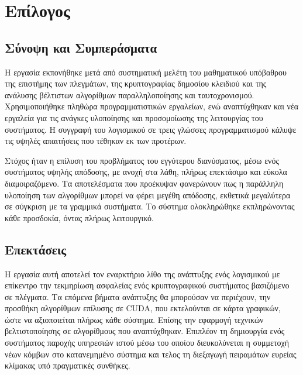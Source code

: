 \section{Επίλογος}
\label{chapClose}
\subsection{Σύνοψη και Συμπεράσματα}

Η εργασία εκπονήθηκε μετά από συστηματική μελέτη του μαθηματικού υπόβαθρου της επιστήμης των πλεγμάτων, της κρυπτογραφίας δημοσίου κλειδιού και της ανάλυσης βέλτιστων αλγορίθμων παραλληλοποίησης και ταυτοχρονισμού. Χρησιμοποιήθηκε πληθώρα προγραμματιστικών εργαλείων, ενώ αναπτύχθηκαν και νέα εργαλεία για τις ανάγκες υλοποίησης και προσομοίωσης της λειτουργίας του συστήματος. Η συγγραφή του λογισμικού σε τρεις γλώσσες προγραμματισμού κάλυψε τις υψηλές απαιτήσεις που τέθηκαν εκ των προτέρων. 

Στόχος ήταν η επίλυση του προβλήματος του εγγύτερου διανύσματος, μέσω ενός συστήματος υψηλής απόδοσης, με ανοχή στα λάθη, πλήρως επεκτάσιμο και εύκολα διαμοιραζόμενο. Τα αποτελέσματα που προέκυψαν φανερώνουν πως η παράλληλη υλοποίηση των αλγορίθμων μπορεί να φέρει μεγέθη απόδοσης, εκθετικά μεγαλύτερα σε σύγκριση με τα γραμμικά συστήματα.  Το σύστημα ολοκληρώθηκε εκπληρώνοντας κάθε προσδοκία, όντας πλήρως λειτουργικό.

\subsection{Επεκτάσεις}

Η εργασία αυτή αποτελεί τον εναρκτήριο λίθο της ανάπτυξης ενός λογισμικού με επίκεντρο την τεκμηρίωση ασφαλείας ενός κρυπτογραφικού συστήματος βασιζόμενο σε πλέγματα. Τα επόμενα βήματα ανάπτυξης θα μπορούσαν να περιέχουν, την προσθήκη αλγορίθμων επίλυσης σε CUDA, που εκτελούνται σε κάρτα γραφικών, ώστε να αξιοποιείται πλήρως κάθε σύστημα. Επίσης την εφαρμογή τεχνικών βελτιστοποίησης σε αλγορίθμους που αναπτύχθηκαν. Επιπλέον τη δημιουργία ενός συστήματος παροχής υπηρεσιών ιστού μέσω του οποίου διευκολύνεται η συμμετοχή νέων κόμβων στο κατανεμημένο σύστημα και τελος τη διεξαγωγή πειραμάτων ευρείας κλίμακας υπό πραγματικές συνθήκες.